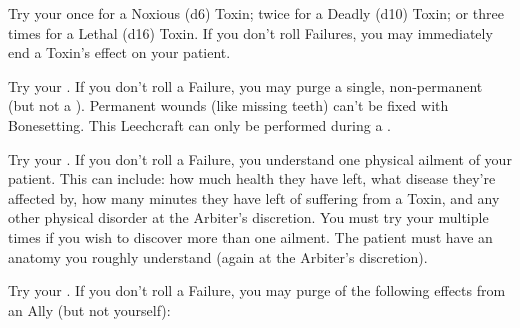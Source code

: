     \newpage




  \LEECHCRAFT[
    Name=Bedevil Toxin,
    Link=leechcraft-bedevil-toxin
  ]

  Try your \INGENUITY once for a Noxious (d6) Toxin; twice for a Deadly (d10) Toxin; or three times for a Lethal (d16) Toxin. If you don't roll  Failures, you may immediately end a Toxin's effect on your patient. 


  \LEECHCRAFT[
    Name=Bonesetting,
    Link=leechcraft-bonesetting
  ]

  Try your \INGENUITY. If you don't roll a Failure, you may purge a single, non-permanent  (but not a ). Permanent wounds (like missing teeth) can't be fixed with Bonesetting. This Leechcraft can only be performed during a .

  \LEECHCRAFT[
    Name=Examination,
    Link=leechcraft-examination
  ]

    Try your \INGENUITY. If you don't roll a Failure, you understand one physical ailment of your patient. This can include: how much health they have left, what disease they're affected by, how many minutes they have left of suffering from a Toxin, and any other physical disorder at the Arbiter's discretion. You must try your \INGENUITY multiple times if you wish to discover more than one ailment. The patient must have an anatomy you roughly understand (again at the Arbiter's discretion).

\cbreak

  \LEECHCRAFT [
    Name=Pharmaceuticals,
    Link=leechcraft-pharmaceuticals
  ]

  Try your \INGENUITY. If you don't roll a Failure, you may purge  of the following effects from an Ally (but not yourself):



